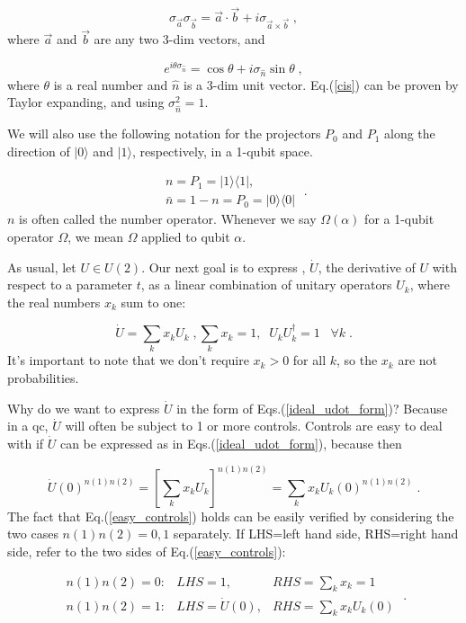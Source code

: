 \documentclass[12pt]{article}
\newcommand{\ket}[1]{|#1\rangle}
\newcommand{\beq}{\begin{equation}}
\newcommand{\eeq}{\end{equation}}
\begin{document}
\beq
\sigma_{\vec{a}}\sigma_{\vec{b}}=\vec{a}\cdot\vec{b}
+ i\sigma_{\vec{a}\times\vec{b}}
\;,
\eeq
where $\vec{a}$ and $\vec{b}$
are any two 3-dim vectors,
and

\beq
e^{i\theta\sigma_{\hat{n}}} = \cos\theta +
i\sigma_{\hat{n}}\sin\theta
\;,
\label{cis}
\eeq
where $\theta$ is a real number and $\hat{n}$
is a 3-dim unit vector. Eq.(\ref{cis})
can be proven by Taylor expanding,
and using $\sigma_{\hat{n}}^2=1$.

We will also use the following notation for the projectors
$P_0$ and $P_1$
along the direction of $\ket{0}$
and $\ket{1}$, respectively,
in a 1-qubit space.

\beq
\begin{array}{l}n=P_1=|1\rangle\langle 1|,\\
\bar{n}=1-n=P_0=|0\rangle\langle 0|
\end{array}
\;.
\eeq
$n$ is often called the number operator.
Whenever we say $\Omega(\alpha)$
for a 1-qubit operator $\Omega$,
we mean $\Omega$ applied to qubit $\alpha$.


As usual,
let $U\in U(2)$.
Our next goal is to express , $\dot{U}$,
the derivative
of $U$  with respect to a
parameter $t$, as a linear
combination
of unitary operators $U_k$,
where the real numbers $x_k$ sum to one:

\begin{subequations}
\label{ideal_udot_form}
\beq
\dot{U}=\sum_k x_k U_k
\;,
\eeq


\beq
\sum_k x_k = 1,\;\;U_kU_k^\dagger=1 \;\;\;\forall k
\;.
\eeq
\end{subequations}
It's important to note that
we don't require $x_k>0$ for all $k$,
so the $x_k$ are not probabilities.

Why do we want to express $\dot{U}$
in the form of Eqs.(\ref{ideal_udot_form})?
Because in a qc, $\dot{U}$
will often be subject to 1 or more controls.
Controls
are easy to deal with
if $\dot{U}$
can be expressed as
in Eqs.(\ref{ideal_udot_form}),
because then

\beq\dot{U}(0)^{n(1)n(2)}=
\left[\sum_k x_k U_k\right]^{n(1)n(2)}
=
\sum_k x_k U_k(0)^{n(1)n(2)}
\;.
\label{easy_controls}
\eeq
The fact that Eq.(\ref{easy_controls})
holds can be easily verified
by considering the two
cases $n(1)n(2)=0,1$ separately.
If LHS=left hand side,
RHS=right hand side, refer to the two sides of
Eq.(\ref{easy_controls}):


\beq
\begin{array}{lll}
n(1)n(2)=0: &LHS=1,& RHS=\sum_k x_k=1\\
n(1)n(2)=1:&LHS= \dot{U}(0),&RHS= \sum_k x_k U_k(0)
\end{array}
\;.
\eeq
\end{document}
